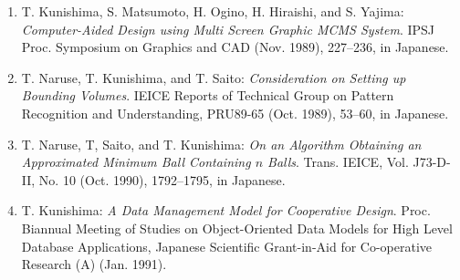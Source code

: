 
\hspace*{\fill}


\begin{enumerate}
\item
T. Kunishima, S. Matsumoto, H. Ogino, H. Hiraishi, and S. Yajima:
{\em Computer-Aided Design using Multi Screen Graphic MCMS System}.
IPSJ Proc. Symposium on Graphics and CAD (Nov. 1989), 227--236,
in Japanese.
\item
T. Naruse, T. Kunishima, and T. Saito:
{\em Consideration on Setting up Bounding Volumes}.
IEICE Reports of Technical Group on Pattern Recognition and 
Understanding, PRU89-65 (Oct. 1989), 53--60,
in Japanese.
\item
T. Naruse, T, Saito, and T. Kunishima:
{\em On an Algorithm Obtaining an Approximated Minimum Ball Containing
$n$ Balls}.
Trans. IEICE, Vol. J73-D-II, No. 10 (Oct. 1990), 1792--1795,
in Japanese.
\item
T. Kunishima:
{\em A Data Management Model for Cooperative Design}.
Proc. Biannual Meeting of Studies on Object-Oriented Data Models for
High Level Database Applications, Japanese Scientific Grant-in-Aid for
Co-operative Research (A) (Jan. 1991).
\end{enumerate}
